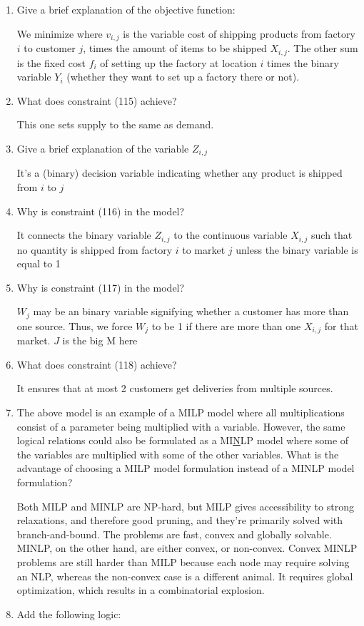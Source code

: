 \documentclass[10pt]{article}
\begin{document}
\begin{enumerate}
    \item Give a brief explanation of the objective function: 

    We minimize where $v_{i, j} $ is the variable cost of shipping products from factory $i $ to customer $ j $, times the amount of items to be shipped $X_{i, j} $. The other sum is the fixed cost $f_i $ of setting up the factory at location $i $ times the binary variable $Y_i $ (whether they want to set up a factory there or not). 
    \item What does constraint (115) achieve?

    This one sets supply to the same as demand. 
    \item Give a brief explanation of the variable $Z_{i, j} $

    It's a (binary) decision variable indicating whether any product is shipped from $i $ to $j $
    \item Why is constraint (116) in the model?

    It connects the binary variable $Z_{i, j} $ to the continuous variable $X_{i, j} $ such that no quantity is shipped from factory $i $ to market $j $ unless the binary variable is equal to 1
    \item Why is constraint (117) in the model?

    $W_j $ may be an binary variable signifying whether a customer has more than one source. Thus, we force $W_j $ to be 1 if there are more than one $X_{i, j} $ for that market. $J $ is the big M here
    \item What does constraint (118) achieve?

    It ensures that at most 2 customers get deliveries from multiple sources. 
    \newpage
    \item The above model is an example of a MILP model where all multiplications consist of a parameter being multiplied with a variable. However, the same logical relations could also be formulated as a MI\underline{N}LP model where some of the variables are multiplied with some of the other variables. What is the advantage of choosing a MILP model formulation instead of a MINLP model formulation?

    Both MILP and MINLP are NP-hard, but MILP gives accessibility to strong relaxations, and therefore good pruning, and they're primarily solved with branch-and-bound. The problems are fast, convex and globally solvable. MINLP, on the other hand, are either convex, or non-convex. Convex MINLP problems are still harder than MILP because each node may require solving an NLP, whereas the non-convex case is a different animal. It requires global optimization, which results in a combinatorial explosion. 
    \item Add the following logic: 


\end{enumerate}
\end{document}
